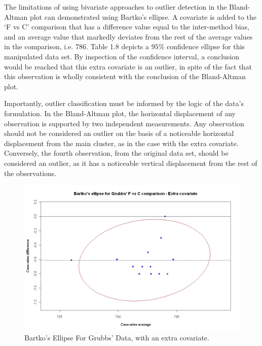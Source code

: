 \documentclass[Main.tex]{subfiles}
\begin{document}
The limitations of using bivariate approaches to outlier detection in the Bland-Altman plot can demonstrated using Bartko's ellipse. A covariate is added to the `F vs C' comparison that has a difference value equal to the inter-method bias, and an average 	value that markedly deviates from the rest of the average values in the comparison, i.e. 786. Table 1.8 depicts a $95\%$ confidence ellipse for this manipulated data set. By inspection of the confidence interval, a conclusion would be reached that this extra covariate is an outlier, in spite of the fact that this
observation is wholly consistent with the conclusion of the	Bland-Altman plot.
	
	
	
Importantly, outlier classification must be informed by the logic of the data's formulation. In the Bland-Altman plot, the horizontal displacement of any observation is supported by two independent measurements. Any observation should not be considered an outlier on the basis of a noticeable horizontal displacement from the main cluster, as in the case with the extra covariate. Conversely, the fourth observation, from the original data set, should be considered an outlier, as it has a noticeable vertical displacement from the rest of the observations.

	
	\begin{figure}[h!]
		\includegraphics[width=130mm]{images/GrubbsBartko2.jpeg}
		\caption{Bartko's Ellipse For Grubbs' Data, with an extra covariate.}\label{GrubbsBartko2}
	\end{figure}
	
\end{document}
